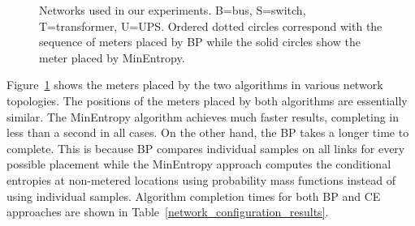 \begin{figure}[!t]
\centering
{}

\begin{centering}
\end{centering}

\begin{centering}
\end{centering}

\begin{centering}
\end{centering}

\caption{Networks used in our experiments. B=bus, S=switch, T=transformer,
U=UPS. Ordered dotted circles correspond with the sequence of meters
placed by BP while the solid circles show the meter placed by MinEntropy.} 
\label{NetworkDiagrams}
\end{figure}

Figure~\ref{NetworkDiagrams} shows the meters placed by the two algorithms in various network topologies. The positions of the meters placed by both algorithms are essentially similar. The MinEntropy algorithm achieves much faster results, completing in less than a second in all cases. On the other hand, the BP takes a longer time to complete. This is because BP compares individual samples on all links for every possible placement while the MinEntropy approach computes the conditional entropies at non-metered locations using probability mass functions instead of using individual samples. Algorithm completion times for both BP and CE approaches are shown in Table~\ref{network_configuration_results}.

